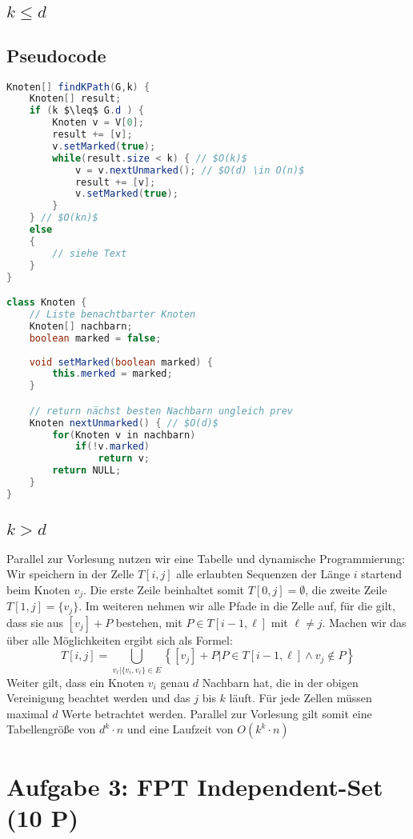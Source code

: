\documentclass[a4paper,11pt,twoside]{scrartcl}
\begin{document}
\subsection{$k \leq d$ }
\subsection{Pseudocode}
\begin{lstlisting}[language=Java]
Knoten[] findKPath(G,k) {
	Knoten[] result;
	if (k $\leq$ G.d ) {
		Knoten v = V[0];
		result += [v];
		v.setMarked(true);
		while(result.size < k) { // $O(k)$
			v = v.nextUnmarked(); // $O(d) \in O(n)$
			result += [v];
			v.setMarked(true);
		}
	} // $O(kn)$
	else 
	{
		// siehe Text
	}
}

class Knoten {
	// Liste benachtbarter Knoten
	Knoten[] nachbarn;
	boolean marked = false;
	
	void setMarked(boolean marked) {
		this.merked = marked;
	}

	// return nächst besten Nachbarn ungleich prev
	Knoten nextUnmarked() { // $O(d)$
		for(Knoten v in nachbarn)
			if(!v.marked)
				return v;
		return NULL;
	}
}
\end{lstlisting}
\subsection{$k > d$}
Parallel zur Vorlesung nutzen wir eine Tabelle und dynamische Programmierung:\\
Wir speichern in der Zelle $T[i,j]$ alle erlaubten Sequenzen der Länge $i$ startend beim Knoten $v_j$. Die erste Zeile beinhaltet somit $T[0,j] = \emptyset$, die zweite Zeile $T[1,j] = \{ v_j \}$. Im weiteren nehmen wir alle Pfade in die Zelle auf, für die gilt, dass sie aus $[v_j] + P$ bestehen, mit $P \in T[i-1,\ell]$ mit $\ell \neq j$. Machen wir das über alle Möglichkeiten ergibt sich als Formel:
\[ T[i,j] = \bigcup_{v_\ell | \{v_i,v_\ell\} \in E } \left\{ [v_j] + P | P \in T[i-1, \ell] \land v_j \notin P \right\} \]
Weiter gilt, dass ein Knoten $v_i$ genau $d$ Nachbarn hat, die in der obigen Vereinigung beachtet werden und das $j$ bis $k$ läuft. Für jede Zellen müssen maximal $d$ Werte betrachtet werden. Parallel zur Vorlesung gilt somit eine Tabellengröße von $d^k \cdot n$ und eine Laufzeit von $O(k^k \cdot n)$
\section{Aufgabe 3: FPT Independent-Set (10 P)}
\end{document}
